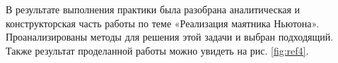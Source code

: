 \Conclusion %

В результате выполнения практики была разобрана аналитическая и конструкторская часть работы по теме  «Реализация маятника Ньютона». Проанализированы методы для решения этой задачи и выбран подходящий. Также результат проделанной работы можно увидеть на рис. \ref{fig:ref4}.

\begin{figure}[ht!]
\end{figure}

